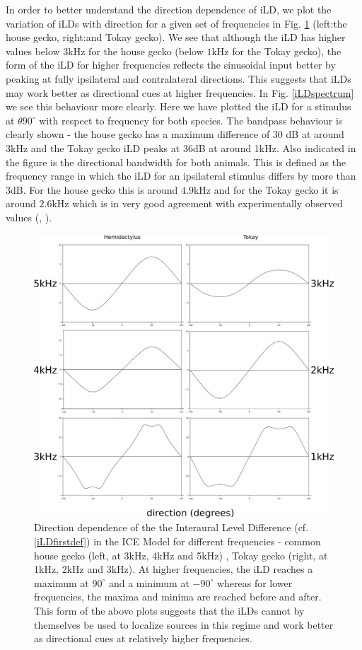 In order to better understand the direction dependence of iLD, we plot the variation
of iLDs with direction for a given set of frequencies in Fig. \ref{iLDdirection} (left:the house gecko, right:and Tokay gecko). We see that although the 
iLD has higher values below $3$kHz for the house gecko (below $1$kHz for the Tokay gecko), the form of the iLD for higher frequencies reflects the sinusoidal input better by peaking at fully
ipsilateral and contralateral directions. This suggests that iLDs may work better as directional cues at higher frequencies. In Fig. \ref{iLDspectrum}
we see this behaviour more clearly. Here we have plotted the iLD for a stimulus at $\theta 90^\circ$ with respect to frequency for both species. The bandpass behaviour
is clearly shown - the house gecko has a maximum difference of $30$ dB at around 3kHz and the Tokay gecko iLD peaks at $36$dB at around 1kHz. Also indicated in the figure is the directional bandwidth
for both animals. This is defined as the frequency range in which the iLD for an ipsilateral stimulus differs by more than 3dB. For the house gecko this is around $4.9$kHz and for the Tokay gecko it is around
$2.6$kHz which is in very good agreement with experimentally observed values (\cite{dalsgaardmanley1}, \cite{dalsgaardmanley2}).
\begin{figure}[ht!]
\centering
  \includegraphics[width=.5\linewidth]{Diagrams/Plots/iLD/all.png}
  \caption[Direction dependence of the Interaural Level Difference for different frequencies.]{Direction dependence of the the Interaural Level Difference (cf. \eqref{iLDfirstdef}) in the ICE Model for different frequencies - common house gecko (left, at 3kHz, 4kHz and 5kHz)
  , Tokay gecko (right, at 1kHz, 2kHz and 3kHz). At higher frequencies, the iLD reaches a maximum at $90^\circ$ and a minimum at $-90^\circ$ whereas for lower frequencies, the maxima and minima are 
  reached before and after. This form of the above plots suggests that the iLDs cannot by themselves be used to localize sources in this regime and work better as directional cues at relatively higher frequencies.}
  \label{iLDdirection}
\end{figure}

